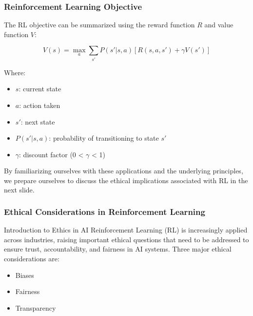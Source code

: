 \documentclass{beamer}
\begin{document}
\begin{frame}[fragile]
    \frametitle{Reinforcement Learning Objective}
    The RL objective can be summarized using the reward function \(R\) and value function \(V\):
    
    \begin{equation}
        V(s) = \max_a \sum_{s'} P(s'|s, a)[R(s, a, s') + \gamma V(s')]
    \end{equation}

    Where:
    \begin{itemize}
        \item \(s\): current state
        \item \(a\): action taken
        \item \(s'\): next state
        \item \(P(s'|s, a)\): probability of transitioning to state \(s'\)
        \item \(\gamma\): discount factor (0 < \(\gamma\) < 1)
    \end{itemize}

    By familiarizing ourselves with these applications and the underlying principles, we prepare ourselves to discuss the ethical implications associated with RL in the next slide.
\end{frame}

\begin{frame}[fragile]
    \frametitle{Ethical Considerations in Reinforcement Learning}
    \begin{block}{Introduction to Ethics in AI}
        Reinforcement Learning (RL) is increasingly applied across industries, raising important ethical questions that need to be addressed to ensure trust, accountability, and fairness in AI systems. Three major ethical considerations are:
        \begin{itemize}
            \item Biases
            \item Fairness
            \item Transparency
        \end{itemize}
    \end{block}
\end{frame}
\end{document}
